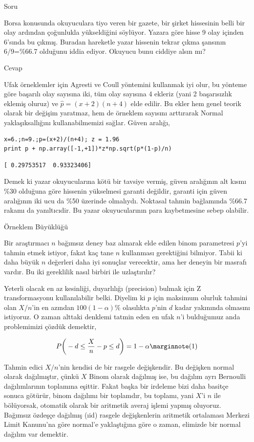 \documentclass[12pt,fleqn]{article}\usepackage{../../common}
\begin{document}
Soru

Borsa konusunda okuyuculara tiyo veren bir gazete, bir şirket hissesinin
belli bir olay ardından çoğunlukla yükseldiğini söylüyor. Yazara göre hisse
9 olay içinden 6'sında bu çıkmış. Buradan hareketle yazar hissenin tekrar
çıkma şansının 6/9=\%66.7 olduğunu iddia ediyor. Okuyucu bunu ciddiye alsın
mı?


Cevap 

Ufak örneklemler için Agresti ve Coull yöntemini kullanmak iyi olur, bu
yönteme göre başarılı olay sayısına iki, tüm olay sayısına 4 ekleriz (yani
2 başarısızlık eklemiş oluruz) ve $\hat{p} = (x+2)(n+4)$ elde edilir. Bu
ekler hem genel teorik olarak bir değişim yaratmaz, hem de örneklem
sayısını arttırarak Normal yaklaşıksallığını kullanabilmemizi sağlar. Güven
aralığı, 

\begin{verbatim}
x=6.;n=9.;p=(x+2)/(n+4); z = 1.96
print p + np.array([-1,+1])*z*np.sqrt(p*(1-p)/n)
\end{verbatim}

\begin{verbatim}
[ 0.29753517  0.93323406]
\end{verbatim}

Demek ki yazar okuyucularına kötü bir tavsiye vermiş, güven aralığının alt
kısmı \%30 olduğuna göre hissenin yükselmesi garanti değildir, garanti için
güven aralığının iki ucu da \%50 üzerinde olmalıydı. Noktasal tahmin
bağlamında \%66.7 rakamı da yanıltıcıdir. Bu yazar okuyucularının para
kaybetmesine sebep olabilir.

Örneklem Büyüklüğü

Bir araştırmacı $n$ bağımsız deney baz alınarak elde edilen binom
parametresi $p$'yi tahmin etmek istiyor, fakat kaç tane $n$ kullanması
gerektiğini bilmiyor. Tabii ki daha büyük $n$ değerleri daha iyi sonuçlar
verecektir, ama her deneyin bir masrafı vardır. Bu iki gereklilik nasıl
birbiri ile uzlaştırılır?

Yeterli olacak en az kesinliği, duyarlılığı (precision) bulmak için Z
transformasyonu kullanılabilir belki. Diyelim ki $p$ için maksimum olurluk
tahmini olan $X/n$'in en azından $100(1-\alpha)\%$ olasılıkta $p$'nin $d$
kadar yakınında olmasını istiyoruz. O zaman alttaki denklemi tatmin eden en
ufak $n$'i bulduğumuz anda problemimizi çözdük demektir, 

$$ P\bigg( -d \le \frac{X}{n} - p \le d \bigg)  = 1-\alpha
\mlabel{1}
$$

Tahmin edici $X/n$'nin kendisi de bir rasgele değişkendir. Bu değişken
normal olarak dağılmıştır, çünkü $X$ Binom olarak dağılmış ise, bu dağılım
ayrı Bernoulli dağılımlarının toplamına eşittir. Fakat başka bir irdeleme
bizi daha basitçe sonuca götürür, binom dağılımı bir toplamdır, bu toplamı,
yani $X$'i $n$ ile bölüyorsak, otomatik olarak bir aritmetik averaj işlemi
yapmış oluyoruz. Bağımsız özdeşçe dağılmış (ıid) rasgele değişkenlerin
aritmetik ortalaması Merkezi Limit Kanunu'na göre normal'e yaklaştığına
göre o zaman, elimizde bir normal dağılım var demektir.
\end{document}
